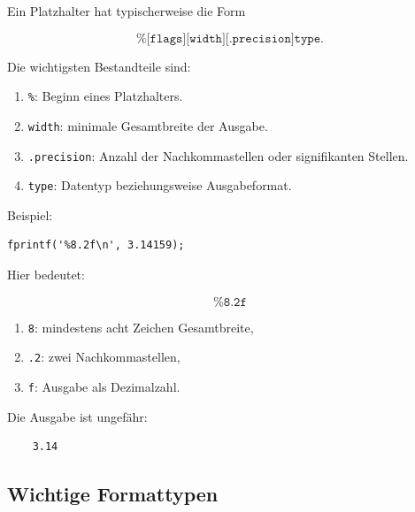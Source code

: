\documentclass[10pt, letterpaper]{article}
\begin{document}
Ein Platzhalter hat typischerweise die Form

\[
\texttt{\%[flags][width][.precision]type}.
\]

Die wichtigsten Bestandteile sind:

\begin{enumerate}
    \item \texttt{\%}: Beginn eines Platzhalters.
    \item \texttt{width}: minimale Gesamtbreite der Ausgabe.
    \item \texttt{.precision}: Anzahl der Nachkommastellen oder signifikanten Stellen.
    \item \texttt{type}: Datentyp beziehungsweise Ausgabeformat.
\end{enumerate}

Beispiel:

\begin{verbatim}
fprintf('%8.2f\n', 3.14159);
\end{verbatim}

Hier bedeutet:

\[
\texttt{\%8.2f}
\]

\begin{enumerate}
    \item \texttt{8}: mindestens acht Zeichen Gesamtbreite,
    \item \texttt{.2}: zwei Nachkommastellen,
    \item \texttt{f}: Ausgabe als Dezimalzahl.
\end{enumerate}

Die Ausgabe ist ungefähr:

\begin{verbatim}
    3.14
\end{verbatim}

\subsection{Wichtige Formattypen}
\end{document}
